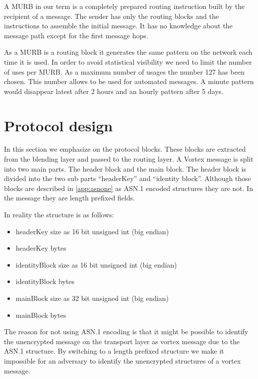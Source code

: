 A MURB in our term is a completely prepared routing instruction built by the recipient of a message. The sender has only the routing blocks and the instructions to assemble the initial message. It has no knowledge about the message path except for the first message hops.

As a MURB is a routing block it generates the same pattern on the network each time it is used. In order to avoid statistical visibility we need to limit the number of uses per MURB. As a maximum number of usages the number 127 has been chosen. This number allows to be used for automated messages. A minute pattern would disappear latest after 2 hours and an hourly pattern after 5 days.


\section{Protocol design}
In this section we emphasize on the protocol blocks. These blocks are extracted from the blending layer and passed to the routing layer. A Vortex message is split into two main parts. The header block and the main block. The header block is divided into the two sub parts ``headerKey'' and ``identity block''. Although those blocks are described in \ref{app:asnone} as ASN.1 encoded structures they are not. In the message they are length prefixed fields.

In reality the structure is as follows:
\begin{itemize}
	\item headerKey size as 16 bit unsigned int (big endian)
	\item headerKey bytes
	\item identityBlock size as 16 bit unsigned int (big endian)
	\item identityBlock bytes
	\item mainBlock size as 32 bit unsigned int (big endian)
	\item mainBlock bytes
\end{itemize}
The reason for not using ASN.1 encoding is that it might be possible to identify the unencrypted message on the transport layer as vortex message due to the ASN.1 structure. By switching to a length prefixed structure we make it impossible for an adversary to identify the unencrypted structures of a vortex message.



